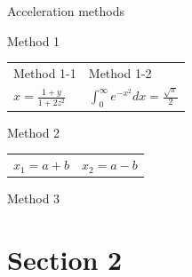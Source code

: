 \documentclass[mathserif,12pt,handout,notes=show]{beamer}
\begin{document}
\begin{frame}{Acceleration methods}
 
    \begin{block}{Method 1}
        \begin{table}
            \begin{tabular}{p{} p{}}
                Method 1-1             & Method 1-2 \\
                $x=\frac{1+y}{1+2z^2}$ & $\int_0^\infty e^{-x^2} dx
                                          =\frac{\sqrt{\pi}}{2}$
            \end{tabular}
        \end{table}
    \end{block}
    \begin{block}{Method 2}
    \begin{table}
            \begin{tabular}{p{} p{}}
            $x_1 = a+b$ & $x_2=a-b $
            \end{tabular}
    \end{table}
    \end{block}
    \begin{block}{Method 3}
    \end{block}
    
\end{frame}
\note{
    \lipsum[1]
}

\section{Section 2}
\end{document}
